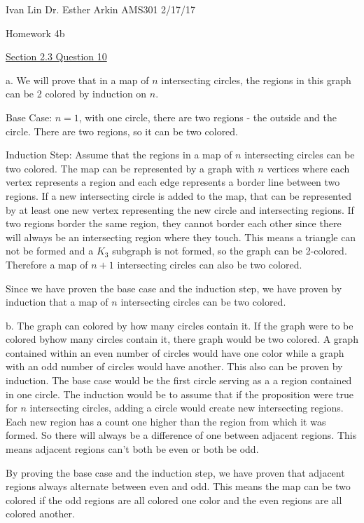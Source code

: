 \documentclass{article}
\begin{document}
Ivan Lin\newline{}
Dr. Esther Arkin\newline{}
AMS301\newline{}
2/17/17

\begin{center}
  Homework 4b
\end{center}

\underline{Section 2.3 Question 10}

a. We will prove that in a map of $n$ intersecting circles, the regions in this graph can be 2 colored by induction on $n$.

Base Case: $n=1$, with one circle, there are two regions - the outside and the circle. There are two regions, so it can be two colored.

Induction Step: Assume that the regions in a map of $n$ intersecting circles can be two colored. The map can be represented by a graph with $n$ vertices where each vertex represents a region and each edge represents a border line between two regions. If a new intersecting circle is added to the map, that can be represented by at least one new vertex representing the new circle and intersecting regions. If two regions border the same region, they cannot border each other since there will always be an intersecting region where they touch. This means a triangle can not be formed and a $K_3$ subgraph is not formed, so the graph can be 2-colored. Therefore a map of $n+1$ intersecting circles can also be two colored.

Since we have proven the base case and the induction step, we have proven by induction that a map of $n$ intersecting circles can be two colored.

b. The graph can colored by how many circles contain it. If the graph were to be colored byhow many circles contain it, there graph would be two colored. A graph contained within an even number of circles would have one color while a graph with an odd number of circles would have another. This also can be proven by induction. The base case would be the first circle serving as a a region contained in one circle. The induction would be to assume that if the proposition were true for $n$ intersecting circles, adding a circle would create new intersecting regions. Each new region has a count one higher than the region from which it was formed. So there will always be a difference of one between adjacent regions. This means adjacent regions can't both be even or both be odd.

By proving the base case and the induction step, we have proven that adjacent regions always alternate between even and odd. This means the map can be two colored if the odd regions are all colored one color and the even regions are all colored another.
\end{document}
